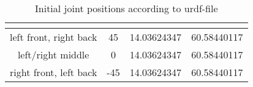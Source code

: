 {\def\arraystretch{1.4}\tabcolsep=5pt
	\begin{table}
		\centering
		\begin{tabular}{| c | c | c | c |} 
			\hline
			& \textbf{\textalpha} & \textbf{\textbeta} & \textbf{\textgamma} \\ [0.5ex] 
			\hline
			\hline
			left front, right back & 45 & 14.03624347 & 60.58440117  \\ 
			
			left/right middle & 0 & 14.03624347 & 60.58440117 \\
			
			right front, left back & -45 & 14.03624347 & 60.58440117 \\
			\hline
		\end{tabular}
		\caption[Initial joint positions]{Initial joint positions according to urdf-file}
		\label{table:Initial joint positions}
	\end{table}
}





